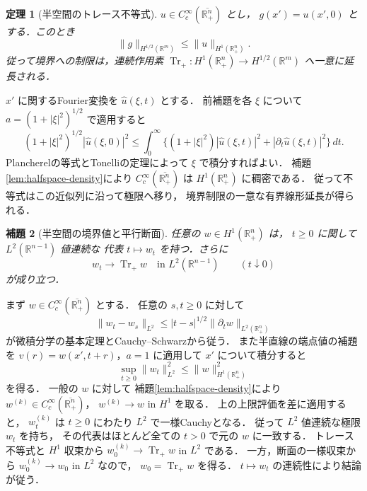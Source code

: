 \documentclass[a5paper,10pt,onecolumn]{jsarticle}
\makeatletter
\theoremstyle{mathnotetheorem}
\newtheorem{theorem}{定理}[section]
\newtheorem{lemma}[theorem]{補題}
\renewcommand{\proofname}{証明}
\renewenvironment{proof}[1][\proofname]{%
  \par\pushQED{\qed}\normalfont\topsep4\p@\@plus2\p@\relax
  \trivlist\item[\hskip\labelsep\bfseries #1]\ignorespaces
}{\popQED\endtrivlist\@endpefalse}
\newcommand{\norm}[1]{\lVert #1\rVert}
\makeatother
\begin{document}
\begin{theorem}[半空間のトレース不等式]
$u\in C_c^\infty(\overline{\mathbb R^n_+})$ とし，
$g(x')=u(x',0)$ とする．このとき
\[
 \norm g_{H^{1/2}(\mathbb R^m)}
 \le\norm u_{H^1(\mathbb R^n_+)}.
\]
従って境界への制限は，連続作用素
$\operatorname{Tr}_+:H^1(\mathbb R^n_+)\to H^{1/2}(\mathbb R^m)$
へ一意に延長される．
\end{theorem}
\begin{proof}
$x'$ に関するFourier変換を $\widehat u(\xi,t)$ とする．
前補題を各 $\xi$ について
$a=(1+|\xi|^2)^{1/2}$ で適用すると
\[
 (1+|\xi|^2)^{1/2}|\widehat u(\xi,0)|^2
 \le\int_0^\infty
 \{(1+|\xi|^2)|\widehat u(\xi,t)|^2
                 +|\partial_t\widehat u(\xi,t)|^2\}\,dt.
\]
Plancherelの等式とTonelliの定理によって $\xi$ で積分すればよい．
補題\ref{lem:halfspace-density}により
$C_c^\infty(\overline{\mathbb R^n_+})$ は
$H^1(\mathbb R^n_+)$ に稠密である．
従って不等式はこの近似列に沿って極限へ移り，
境界制限の一意な有界線形延長が得られる．
\end{proof}

\begin{lemma}[半空間の境界値と平行断面]
\label{lem:halfspace-slice}
任意の $w\in H^1(\mathbb R^n_+)$ は，
$t\ge0$ に関して $L^2(\mathbb R^{n-1})$ 値連続な
代表 $t\mapsto w_t$ を持つ．さらに
\[
 w_t\longrightarrow\operatorname{Tr}_+w
 \quad\text{in }L^2(\mathbb R^{n-1})
 \qquad(t\downarrow0)
\]
が成り立つ．
\end{lemma}
\begin{proof}
まず $w\in C_c^\infty(\overline{\mathbb R^n_+})$ とする．
任意の $s,t\ge0$ に対して
\[
 \norm{w_t-w_s}_{L^2}
 \le |t-s|^{1/2}\norm{\partial_tw}_{L^2(\mathbb R^n_+)}
\]
が微積分学の基本定理とCauchy--Schwarzから従う．
また半直線の端点値の補題を
$v(r)=w(x',t+r)$，$a=1$ に適用して
$x'$ について積分すると
\[
 \sup_{t\ge0}\norm{w_t}_{L^2}^2
 \le\norm{w}_{H^1(\mathbb R^n_+)}^2
\]
を得る．
一般の $w$ に対して
補題\ref{lem:halfspace-density}により
$w^{(k)}\in C_c^\infty(\overline{\mathbb R^n_+})$，
$w^{(k)}\to w$ in $H^1$ を取る．
上の上限評価を差に適用すると，
$w^{(k)}_t$ は $t\ge0$ にわたり
$L^2$ で一様Cauchyとなる．
従って $L^2$ 値連続な極限 $w_t$ を持ち，
その代表はほとんど全ての $t>0$ で元の $w$ に一致する．
トレース不等式と $H^1$ 収束から
$w^{(k)}_0\to\operatorname{Tr}_+w$ in $L^2$ である．
一方，断面の一様収束から
$w^{(k)}_0\to w_0$ in $L^2$ なので，
$w_0=\operatorname{Tr}_+w$ を得る．
$t\mapsto w_t$ の連続性により結論が従う．
\end{proof}
\end{document}
